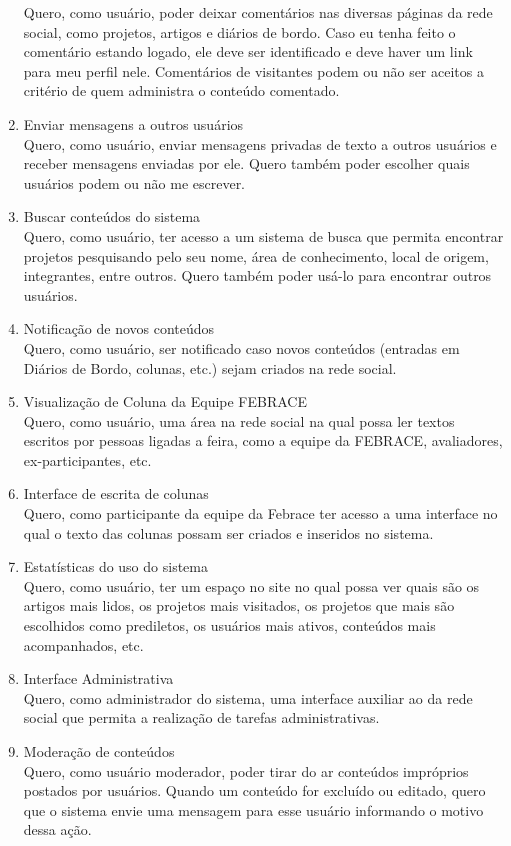 \documentclass[a4paper,12pt,font=plain,header=plain]{abnt}
\begin{document}
\begin{enumerate}
		Quero, como usuário, poder deixar comentários nas diversas páginas da rede social, como projetos, artigos e diários de bordo. Caso eu tenha feito o comentário estando logado, ele deve ser identificado e deve haver um link para meu perfil nele. Comentários de visitantes podem ou não ser aceitos a critério de quem administra o conteúdo comentado.
	 \item Enviar mensagens a outros usuários \\
		Quero, como usuário, enviar mensagens privadas de texto a outros usuários e receber mensagens enviadas por ele. Quero também poder escolher quais usuários podem ou não me escrever.
	 \item Buscar conteúdos do sistema \\
		Quero, como usuário, ter acesso a  um sistema de busca que permita encontrar projetos pesquisando pelo seu nome, área de conhecimento, local de origem, integrantes, entre outros. Quero também poder usá-lo para encontrar outros usuários.
	 \item Notificação de novos conteúdos \\
		Quero, como usuário, ser notificado caso novos conteúdos (entradas em Diários de Bordo, colunas, etc.) sejam criados na rede social.
	 \item Visualização de Coluna da Equipe FEBRACE \\
		Quero, como usuário, uma área na rede social na qual possa ler textos escritos por pessoas ligadas a feira, como a equipe da FEBRACE, avaliadores, ex-participantes, etc.
	 \item Interface de escrita de colunas \\
                Quero, como participante da equipe da Febrace ter acesso a uma interface no qual o texto das colunas possam ser criados e inseridos no sistema.
	 \item Estatísticas do uso do sistema \\
		Quero, como usuário, ter um espaço no site no qual possa ver quais são os artigos mais lidos, os projetos mais visitados, os projetos que mais são escolhidos como prediletos, os usuários mais ativos, conteúdos mais acompanhados, etc.
	 \item Interface Administrativa \\
		Quero, como administrador do sistema, uma interface auxiliar ao da rede social que permita a realização de tarefas administrativas.
	 \item Moderação de conteúdos \\
		Quero, como usuário moderador, poder tirar do ar conteúdos impróprios postados por usuários. Quando um conteúdo for excluído ou editado, quero que o sistema envie uma mensagem para esse usuário informando o motivo dessa ação.

\end{enumerate}
\end{document}
